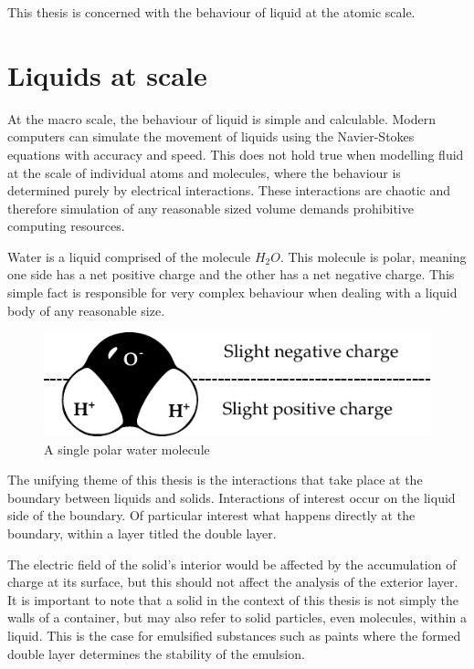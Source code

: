 
This thesis is concerned with the behaviour of liquid at the atomic scale.

\section{Liquids at scale}
At the macro scale, the behaviour of liquid is simple and calculable.
Modern computers can simulate the movement of liquids using the Navier-Stokes equations with accuracy and speed.
This does not hold true when modelling fluid at the scale of individual atoms and molecules, where the behaviour is determined purely by electrical interactions.
These interactions are chaotic and therefore simulation of any reasonable sized volume demands prohibitive computing resources.

Water is a liquid comprised of the molecule $H_{2}O$.
This molecule is polar, meaning one side has a net positive charge and the other has a net negative charge.
This simple fact is responsible for very complex behaviour when dealing with a liquid body of any reasonable size.

\begin{figure}
    \begin{center}
        \includegraphics{content/introduction/graphics/polarWater}
    \end{center}
    \caption{A single polar water molecule}
    \label{fig:waterMolecule}
\end{figure}

The unifying theme of this thesis is the interactions that take place at the boundary between liquids and solids.
Interactions of interest occur on the liquid side of the boundary.
Of particular interest what happens directly at the boundary, within a layer titled the double layer.

The electric field of the solid's interior would be affected by the accumulation of charge at its surface, but this should not affect the analysis of the exterior layer.
It is important to note that a solid in the context of this thesis is not simply the walls of a container, but may also refer to solid particles, even molecules, within a liquid.
This is the case for emulsified substances such as paints where the formed double layer determines the stability of the emulsion.

